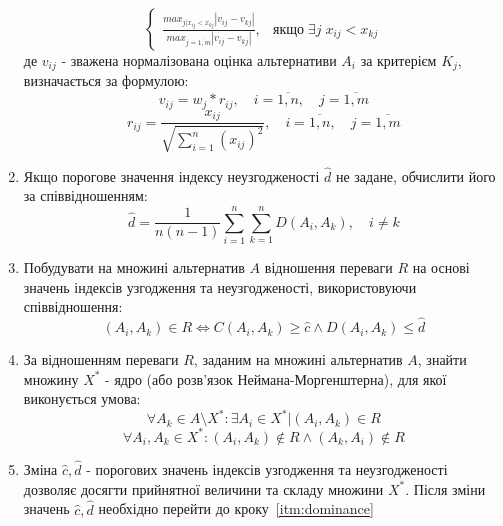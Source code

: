 \begin{enumerate}
\begin{equation}
\begin{cases}
            \frac{
                max_{j|x_{ij} < x_{kj}}
                |v_{ij} - v_{kj}|
            } {
                max_{j=\overline{1, m}}
                |v_{ij} - v_{kj}|
            },
            & \text{якщо}
            \; \exists j
            \; x_{ij} < x_{kj}
        \end{cases}
    \end{equation}
    де $v_{ij}$ - зважена нормалізована оцінка альтернативи $A_i$ за критерієм $K_j$,
    визначається за формулою:
    \begin{equation}
        \label{eq:weighted_normalized_estimate}
        v_{ij} = w_j * r_{ij},
        \quad i = \overline{1, n},
        \quad j = \overline{1, m}
    \end{equation}
    \begin{equation}
        \label{eq:normalized_estimate}
        r_{ij} = \frac{x_{ij}}{\sqrt{\sum_{i=1}^n (x_{ij})^2}},
        \quad i = \overline{1, n},
        \quad j = \overline{1, m}
    \end{equation}

    \item
    Якщо порогове значення індексу неузгодженості $\hat d$ не задане,
    обчислити його за співвідношенням:
    \begin{equation}
        \label{eq:discordance_threshold}
        \hat d =
        \frac{1}{n(n-1)}
        \sum_{i=1}^n
        \sum_{k=1}^n D(A_i, A_k),
        \quad i \neq k
    \end{equation}

    \item
    \label{itm:dominance}
    Побудувати на множині альтернатив $A$ відношення переваги $R$ на основі значень
    індексів узгодження та неузгодженості, використовуючи співвідношення:
    \begin{equation}
        \label{eq:dominance}
        (A_i, A_k) \in R
        \Leftrightarrow
        C(A_i, A_k) \geq \hat c
        \wedge
        D(A_i, A_k) \leq \hat d
    \end{equation}

    \item
    За відношенням переваги $R$, заданим на множині альтернатив $A$,
    знайти множину $X^*$ - ядро (або розв'язок Неймана-Моргенштерна),
    для якої виконується умова:
    \begin{equation}
        \label{eq:neumann_morgenstern_kernel0}
        \forall A_k \in A \setminus X^*:
        \exists A_i \in X^* | (A_i, A_k) \in R
    \end{equation}
    \begin{equation}
        \label{eq:neumann_morgenstern_kernel1}
        \forall A_i, A_k \in X^*:
        (A_i, A_k) \notin R
        \wedge
        (A_k, A_i) \notin R
    \end{equation}

    \item
    Зміна $\hat c, \hat d$ - порогових значень індексів узгодження та неузгодженості
    дозволяє досягти прийнятної величини та складу множини $X^*$.
    Після зміни значень $\hat c, \hat d$ необхідно перейти до кроку~\ref{itm:dominance}
\end{enumerate}
